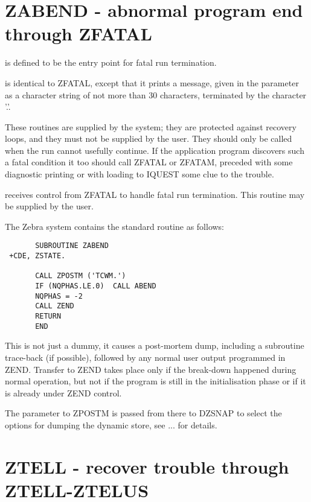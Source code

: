 \section{ZABEND - abnormal program end through ZFATAL}

is defined to be the entry point for fatal run termination.

is identical to ZFATAL,
except that it prints a message,
given in the parameter as a character
string of not more than 30 characters,
terminated by the character '.'.

These routines are supplied by the system;
they are protected against recovery loops,
and they must not be supplied by the user.
They should only be called when the run cannot usefully continue.
If the application program discovers such a fatal condition
it too should call ZFATAL or ZFATAM,
preceded with some diagnostic printing or
with loading to IQUEST some clue to the trouble.

\vspace{4mm}
receives control from ZFATAL to handle fatal run termination.
This routine may be supplied by the user.

The Zebra system contains the standard routine as follows:

\begin{verbatim}
       SUBROUTINE ZABEND
 +CDE, ZSTATE.

       CALL ZPOSTM ('TCWM.')
       IF (NQPHAS.LE.0)  CALL ABEND
       NQPHAS = -2
       CALL ZEND
       RETURN
       END
\end{verbatim} 

This is not just a dummy,
it causes a post-mortem dump,
including a subroutine trace-back (if possible),
followed by any normal user output programmed in ZEND.
Transfer to ZEND takes place only if the break-down happened
during normal operation,
but not if the program is still in the initialisation phase
or if it is already under ZEND control.

The parameter to ZPOSTM is passed from there to DZSNAP
to select the options for dumping the dynamic store,
see   ...   for details.

\section{ZTELL  - recover trouble through ZTELL-ZTELUS}

